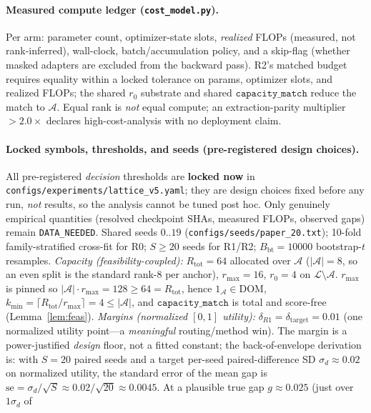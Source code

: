 \documentclass[11pt]{article}
\theoremstyle{definition}
\newcommand{\Aset}{\mathcal{A}}
\newcommand{\Lset}{\mathcal{L}}
\newcommand{\Rtot}{R_{\mathrm{tot}}}
\newcommand{\rmax}{r_{\max}}
\begin{document}
\paragraph{Measured compute ledger (\texttt{cost\_model.py}).}
Per arm: parameter count, optimizer-state slots, \emph{realized} FLOPs (measured, not
rank-inferred), wall-clock, batch/accumulation policy, and a skip-flag (whether masked
adapters are excluded from the backward pass). R2's matched budget requires equality within
a locked tolerance on params, optimizer slots, and realized FLOPs; the shared $r_0$
substrate and shared $\texttt{capacity\_match}$ reduce the match to $\Aset$. Equal rank is
\emph{not} equal compute; an extraction-parity multiplier $>2.0\times$ declares
high-cost-analysis with no deployment claim.

\paragraph{Locked symbols, thresholds, and seeds (pre-registered design choices).}
All pre-registered \emph{decision} thresholds are \textbf{locked now} in
\texttt{configs/experiments/lattice\_v5.yaml}; they are design choices fixed before any
run, \emph{not} results, so the analysis cannot be tuned post hoc. Only genuinely
empirical quantities (resolved checkpoint SHAs, measured FLOPs, observed gaps) remain
\texttt{DATA\_NEEDED}. Shared seeds $0..19$ (\texttt{configs/seeds/paper\_20.txt});
10-fold family-stratified cross-fit for R0; $S\ge20$ seeds for R1/R2;
$B_{\mathrm{bt}}{=}10000$ bootstrap-$t$ resamples. \emph{Capacity (feasibility-coupled):}
$\Rtot{=}64$ allocated over $\Aset$ ($|\Aset|{=}8$, so an even split is the standard
rank-$8$ per anchor), $\rmax{=}16$, $r_0{=}4$ on $\Lset\setminus\Aset$. $\rmax$ is pinned
so $|\Aset|\cdot\rmax{=}128\ge64{=}\Rtot$, hence $1_{\Aset}\in\mathrm{DOM}$,
$k_{\min}{=}\lceil\Rtot/\rmax\rceil{=}4\le|\Aset|$, and $\texttt{capacity\_match}$ is total
and score-free (Lemma~\ref{lem:feas}). \emph{Margins (normalized $[0,1]$ utility):}
$\delta_{R1}{=}\delta_{\mathrm{target}}{=}0.01$ (one normalized utility point---a
\emph{meaningful} routing/method win). The margin is a power-justified \emph{design} floor,
not a fitted constant; the back-of-envelope derivation is: with $S{=}20$ paired seeds and a
target per-seed paired-difference SD $\sigma_d\!\approx\!0.02$ on normalized utility, the
standard error of the mean gap is $\mathrm{se}\!=\!\sigma_d/\sqrt{S}\!\approx\!0.02/\sqrt{20}
\!\approx\!0.0045$. At a plausible true gap $g\!\approx\!0.025$ (just over $1\sigma_d$ of
\end{document}
